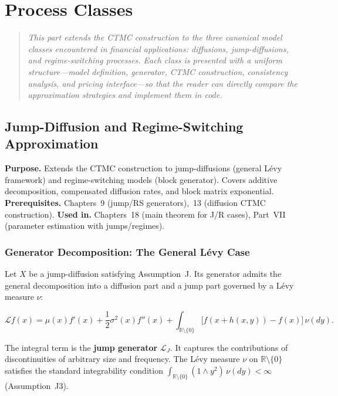 \documentclass[11pt,a4paper,openany]{book}
\theoremstyle{definition}
\theoremstyle{plain}
\theoremstyle{remark}
\newcommand{\1}{\mathbbm{1}}
\newcommand{\R}{\mathbb{R}}
\begin{document}
\part{Process Classes}

\begin{quote}
\itshape This part extends the CTMC construction to the three canonical model classes encountered in financial applications: diffusions, jump-diffusions, and regime-switching processes. Each class is presented with a uniform structure---model definition, generator, CTMC construction, consistency analysis, and pricing interface---so that the reader can directly compare the approximation strategies and implement them in code.
\end{quote}

\chapter{Jump-Diffusion and Regime-Switching Approximation}

\noindent\textbf{Purpose.} Extends the CTMC construction to jump-diffusions (general L\'{e}vy framework) and regime-switching models (block generator). Covers additive decomposition, compensated diffusion rates, and block matrix exponential.
\textbf{Prerequisites.} Chapters~9 (jump/RS generators),~13 (diffusion CTMC construction).
\textbf{Used in.} Chapters~18 (main theorem for J/R cases), Part~VII (parameter estimation with jumps/regimes).

\section{Generator Decomposition: The General L\'{e}vy Case}

Let $X$ be a jump-diffusion satisfying Assumption~J. Its generator admits the general decomposition into a diffusion part and a jump part governed by a L\'{e}vy measure $\nu$:

\[
\boxed{\mathcal{L} f(x) = \mu(x) f'(x) + \frac{1}{2} \sigma^{2}(x) f''(x) + \int_{\R \setminus \{0\}} \bigl[f(x + h(x,y)) - f(x)\bigr] \, \nu(dy)}.
\]

The integral term is the \textbf{jump generator} $\mathcal{L}_{J}$. It captures the contributions of discontinuities of arbitrary size and frequency. The L\'{e}vy measure $\nu$ on $\R \setminus \{0\}$ satisfies the standard integrability condition $\int_{\R \setminus \{0\}} (1 \wedge y^{2}) \, \nu(dy) < \infty$ (Assumption~J3).
\end{document}
